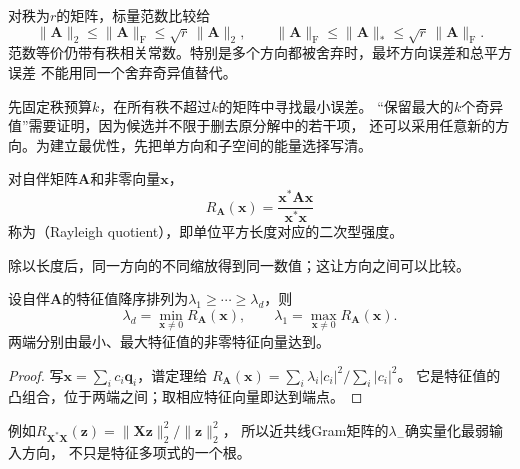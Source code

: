对秩为$r$的矩阵，标量范数比较给
\begin{equation}
 \lVert\bm A\rVert_2\leq\lVert\bm A\rVert_{\mathrm F}
 \leq\sqrt r\,\lVert\bm A\rVert_2,\qquad
 \lVert\bm A\rVert_{\mathrm F}\leq\lVert\bm A\rVert_*
 \leq\sqrt r\,\lVert\bm A\rVert_{\mathrm F}.
 \label{eq:matrix-analysis-norm-rank-relations}
\end{equation}
范数等价仍带有秩相关常数。特别是多个方向都被舍弃时，最坏方向误差和总平方误差
不能用同一个舍弃奇异值替代。


先固定秩预算$k$，在所有秩不超过$k$的矩阵中寻找最小误差。
“保留最大的$k$个奇异值”需要证明，因为候选并不限于删去原分解中的若干项，
还可以采用任意新的方向。为建立最优性，先把单方向和子空间的能量选择写清。

\begin{definition}[Rayleigh商]
\label{def:matrix-analysis-rayleigh-quotient}
对自伴矩阵$\bm A$和非零向量$\bm x$，
\begin{equation}
 R_{\bm A}(\bm x)=\frac{\bm x^*\bm A\bm x}{\bm x^*\bm x}
 \label{eq:matrix-analysis-rayleigh-quotient}
\end{equation}
称为（Rayleigh quotient），即单位平方长度对应的二次型强度。
\end{definition}
除以长度后，同一方向的不同缩放得到同一数值；这让方向之间可以比较。
\begin{theorem}
\label{thm:matrix-analysis-rayleigh-ritz}
设自伴$\bm A$的特征值降序排列为$\lambda_1\geq\cdots\geq\lambda_d$，则
\begin{equation}
 \lambda_d=\min_{\bm x\neq0}R_{\bm A}(\bm x),\qquad
 \lambda_1=\max_{\bm x\neq0}R_{\bm A}(\bm x).
 \label{eq:matrix-analysis-rayleigh-ritz}
\end{equation}
两端分别由最小、最大特征值的非零特征向量达到。
\end{theorem}
\begin{proof}
写$\bm x=\sum_i c_i\bm q_i$，谱定理给
$R_{\bm A}(\bm x)=\sum_i\lambda_i|c_i|^2/\sum_i|c_i|^2$。
它是特征值的凸组合，位于两端之间；取相应特征向量即达到端点。
\end{proof}
例如$R_{\bm X^*\bm X}(\bm z)=
\lVert\bm X\bm z\rVert_2^2/\lVert\bm z\rVert_2^2$，
所以近共线Gram矩阵的$\lambda_-$确实量化最弱输入方向，
不只是特征多项式的一个根。

